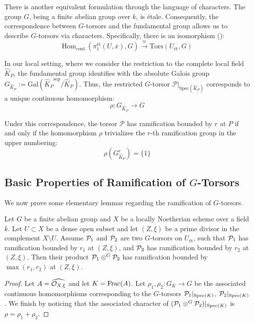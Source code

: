 There is another equivalent formulation through the language of characters.
The group $G$, being a finite abelian group over $k$, is \'etale.
Consequently, the correspondence between $G$-torsors and the fundamental group allows us to describe $G$-torsors
 via characters. Specifically, there is an isomorphism ():
\[ \mathrm{Hom}_{\mathrm{cont.}}(\pi_1^{\text{\'et}}(U, \overline{x}), G) \xrightarrow{\cong} \mathrm{Tors}(U_{\text{\'et}}, G) \]

In our local setting, where we consider the restriction to the complete local field $\widehat{K}_P$,
the fundamental group identifies with the absolute Galois group
$G_{\widehat{K}_P} := \mathrm{Gal}({\widehat{K}_P}^{\mathrm{sep}}/{\widehat{K}_P})$.
Thus, the restricted $G$-torsor $\mathcal{P}|_{\mathrm{Spec}(\widehat{K}_P)}$ corresponds to a unique continuous homomorphism:
\[ \rho : G_{\widehat{K}_P} \to G \]

Under this correspondence, the torsor $\mathcal{P}$ has ramification bounded by $r$ at $P$
if and only if the homomorphism $\rho$ trivializes the $r$-th ramification group in the upper numbering:
\[ \rho(G_{\widehat{K}_P}^r) = \{ 1 \} \]

\subsection*{Basic Properties of Ramification of \texorpdfstring{$G$-Torsors}{G-Torsors}}
We now prove some elementary lemmas regarding the ramification of $G$-torsors.
\begin{lemma}\label{lemma:bounding_ramification_of_contracted_product}
    Let $G$ be a finite abelian group and $X$ be a locally Noetherian scheme over a field $k$.
    Let $U \subset X$ be a dense open subset and let $(Z, \xi)$ be a prime divisor in the complement $X \setminus U$.
    Assume $\mathcal{P}_1$ and $\mathcal{P}_2$ are two $G$-torsors on $U_{\text{ét}}$, such that $\mathcal{P}_1$ has ramification bounded by $r_1$ at $(Z, \xi)$, and $\mathcal{P}_2$ has ramification bounded by $r_2$ at $(Z, \xi)$.
    Then their product $\mathcal{P}_1 \otimes^G \mathcal{P}_2$ has ramification bounded by $\max(r_1, r_2)$ at $(Z, \xi)$.
\end{lemma}
\begin{proof}
    Let $A=\widehat{\mathcal{O}_{X, \xi}}$ and let $K=\operatorname{Frac}(A)$.
    Let $\rho_1, \rho_2: G_K \to G$ be the associated continuous homomorphisms corresponding to the $G$-torsors
    $\mathcal{P}_1|_{\operatorname{Spec}(K)}$, $\mathcal{P}_2|_{\operatorname{Spec}(K)}$.
    We finish by noticing that the associated character of $(\mathcal{P}_1 \otimes^G \mathcal{P}_2)|_{\operatorname{Spec}(K)}$ is $\rho=\rho_1 + \rho_2$.
\end{proof}


